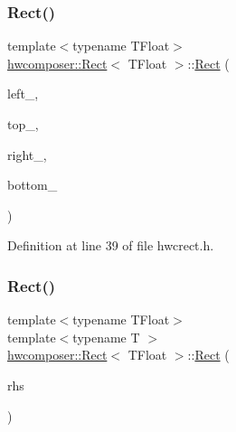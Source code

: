 \subsubsection{\texorpdfstring{Rect()}{Rect()}\hspace{0.1cm}{\footnotesize\ttfamily [2/3]}}
{\footnotesize\ttfamily template$<$typename T\+Float$>$ \\
\mbox{\hyperlink{structhwcomposer_1_1Rect}{hwcomposer\+::\+Rect}}$<$ T\+Float $>$\+::\mbox{\hyperlink{structhwcomposer_1_1Rect}{Rect}} (\begin{DoxyParamCaption}\item[{T\+Float}]{left\+\_\+,  }\item[{T\+Float}]{top\+\_\+,  }\item[{T\+Float}]{right\+\_\+,  }\item[{T\+Float}]{bottom\+\_\+ }\end{DoxyParamCaption})\hspace{0.3cm}{\ttfamily [inline]}}



Definition at line 39 of file hwcrect.\+h.


\begin{DoxyCode}{0}
\end{DoxyCode}
\mbox{\label{structhwcomposer_1_1Rect_a0cf8a9ffd29d165ff0b800f4a7f6fecb}} 
\subsubsection{\texorpdfstring{Rect()}{Rect()}\hspace{0.1cm}{\footnotesize\ttfamily [3/3]}}
{\footnotesize\ttfamily template$<$typename T\+Float$>$ \\
template$<$typename T $>$ \\
\mbox{\hyperlink{structhwcomposer_1_1Rect}{hwcomposer\+::\+Rect}}$<$ T\+Float $>$\+::\mbox{\hyperlink{structhwcomposer_1_1Rect}{Rect}} (\begin{DoxyParamCaption}\item[{const \mbox{\hyperlink{structhwcomposer_1_1Rect}{Rect}}$<$ T $>$ \&}]{rhs }\end{DoxyParamCaption})\hspace{0.3cm}{\ttfamily [inline]}}



